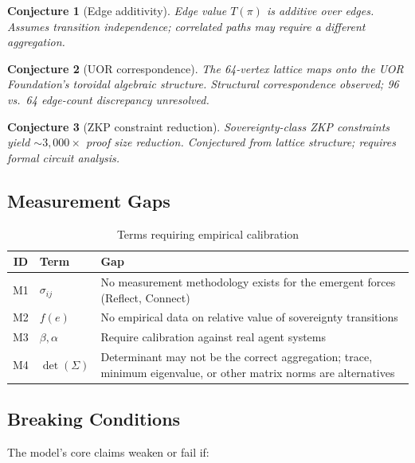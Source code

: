 \documentclass[11pt,a4paper]{article}
\newtheorem{conjecture}{Conjecture}[section]
\begin{document}
\begin{conjecture}[Edge additivity]\label{conj:additive}
Edge value $T(\pi)$ is additive over edges. Assumes transition independence; correlated paths may require a different aggregation.
\end{conjecture}

\begin{conjecture}[UOR correspondence]\label{conj:uor}
The 64-vertex lattice maps onto the UOR Foundation's toroidal algebraic structure. Structural correspondence observed; 96 vs.\ 64 edge-count discrepancy unresolved.
\end{conjecture}

\begin{conjecture}[ZKP constraint reduction]\label{conj:zkp}
Sovereignty-class ZKP constraints yield ${\sim}3{,}000\times$ proof size reduction. Conjectured from lattice structure; requires formal circuit analysis.
\end{conjecture}

\subsection{Measurement Gaps}

\begin{table}[h]
\centering
\caption{Terms requiring empirical calibration}
\begin{tabular}{@{}clL{8cm}@{}}
\toprule
\textbf{ID} & \textbf{Term} & \textbf{Gap} \\
\midrule
M1 & $\sigma_{ij}$ & No measurement methodology exists for the emergent forces (Reflect, Connect) \\
M2 & $f(e)$ & No empirical data on relative value of sovereignty transitions \\
M3 & $\beta, \alpha$ & Require calibration against real agent systems \\
M4 & $\det(\Sigma)$ & Determinant may not be the correct aggregation; trace, minimum eigenvalue, or other matrix norms are alternatives \\
\bottomrule
\end{tabular}
\end{table}

\subsection{Breaking Conditions}

The model's core claims weaken or fail if:
\end{document}
